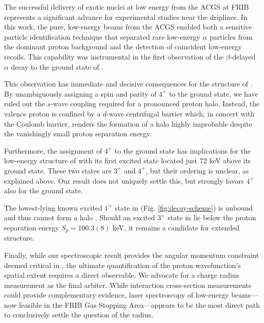 \documentclass[

reprint,

superscriptaddress,









amsmath,amssymb,
aps,






floatfix,
prl
]{revtex4-2}
\begin{document}
The successful delivery of exotic nuclei at low energy from the ACGS at FRIB represents a significant advance for experimental studies near the driplines.
In this work, the pure, low-energy beams from the ACGS enabled both a sensitive particle identification technique that separated rare low-energy $\alpha$ particles from the dominant proton background and the detection of coincident low-energy \neon{} recoils.
This capability was instrumental in the first observation of the $\beta$-delayed $\alpha$ decay to the ground state of \neon{}.

This observation has immediate and decisive consequences for the structure of \alum{}.
By unambiguously assigning a spin and parity of $4^+$ to the ground state, we have ruled out the $s$-wave coupling required for a pronounced proton halo.
Instead, the valence proton is confined by a $d$-wave centrifugal barrier which, in concert with the Coulomb barrier, renders the formation of a halo highly improbable despite the vanishingly small proton separation energy.

Furthermore, the assignment of $4^+$ to the \alum{} ground state has implications for the low-energy structure of \flor{} with its first excited state located just 72 keV above its ground state.
These two states are $3^+$ and $4^+$, but their ordering is unclear, as explained above.
Our result does not uniquely settle this, but strongly favors $4^+$ also for the \flor{} ground state.

The lowest-lying known excited $1^+$ state in \alum{} (Fig. \ref{fig:decay-scheme}) is unbound and thus cannot form a halo \cite{Zha24}.
Should an excited $3^+$ state in \alum{} lie below the proton separation energy $S_p = 100.3(8)$ keV, it remains a candidate for extended structure.

Finally, while our spectroscopic result provides the angular momentum constraint deemed critical in \cite{Cam24}, the ultimate quantification of the proton wavefunction's spatial extent requires a direct observable. We advocate for a charge radius measurement as the final arbiter.
While interaction cross-section measurements could provide complementary evidence, laser spectroscopy of low-energy beams—now feasible in the FRIB Gas Stopping Area—appears to be the most direct path to conclusively settle the question of the \alum{} radius.
\end{document}
